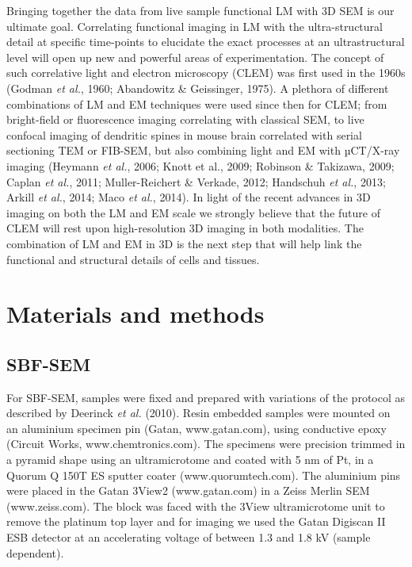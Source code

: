 \documentclass{article}
\begin{document}
Bringing together the data from live sample functional LM with 3D SEM is our ultimate goal. Correlating functional imaging in LM with the ultra-structural detail at specific time-points to elucidate the exact processes at an ultrastructural level will open up new and powerful areas of experimentation. The concept of such correlative light and electron microscopy (CLEM) was first used in the 1960s (Godman \textit{et al.}, 1960; Abandowitz \& Geissinger, 1975). A plethora of different combinations of LM and EM techniques were used since then for CLEM; from bright-field or fluorescence imaging correlating with classical SEM, to live confocal imaging of dendritic spines in mouse brain correlated with serial sectioning TEM or FIB-SEM, but also combining light and EM with µCT/X-ray imaging (Heymann \textit{et al.}, 2006; Knott et al., 2009; Robinson \& Takizawa, 2009; Caplan \textit{et al.}, 2011; Muller-Reichert \& Verkade, 2012; Handschuh \textit{et al.}, 2013; Arkill \textit{et al.}, 2014; Maco \textit{et al.}, 2014). In light of the recent advances in 3D imaging on both the LM and EM scale we strongly believe that the future of CLEM will rest upon high-resolution 3D imaging in both modalities. The combination of LM and EM in 3D is the next step that will help link the functional and structural details of cells and tissues.

\section*{Materials and methods}

\subsection*{SBF-SEM}

For SBF-SEM, samples were fixed and prepared with variations of the protocol as described by Deerinck \textit{et al.} (2010). Resin embedded samples were mounted on an aluminium specimen pin (Gatan, www.gatan.com), using conductive epoxy (Circuit Works, www.chemtronics.com). The specimens were precision trimmed in a pyramid shape using an ultramicrotome and coated with 5 nm of Pt, in a Quorum Q 150T ES sputter coater (www.quorumtech.com). The aluminium pins were placed in the Gatan 3View2 (www.gatan.com) in a Zeiss Merlin SEM (www.zeiss.com). The block was faced with the 3View ultramicrotome unit to remove the platinum top layer and for imaging we used the Gatan Digiscan II ESB detector at an accelerating voltage of between 1.3 and 1.8 kV (sample dependent).
\end{document}
